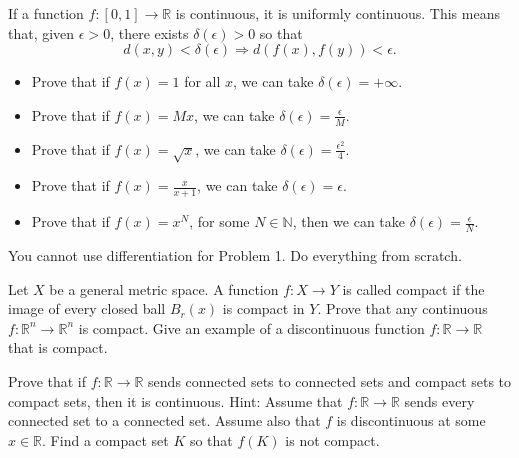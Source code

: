   \begin{exercise}
    If a function $f : [0, 1] \to \mathbb{R}$ is continuous, it is uniformly continuous. This means that, given $\epsilon > 0$, there exists $\delta(\epsilon) > 0$ so that
    \begin{equation}
      d(x, y) < \delta(\epsilon) \Rightarrow d(f(x), f(y)) < \epsilon.
    \end{equation}
    \begin{itemize}
      \item Prove that if $f(x) = 1$ for all $x$, we can take $\delta(\epsilon) = +\infty$.
      \item Prove that if $f(x) = Mx$, we can take $\delta(\epsilon) = \frac{\epsilon}{M}$.
      \item Prove that if $f(x) = \sqrt{x}$, we can take $\delta(\epsilon) = \frac{\epsilon^2}{4}$.
      \item Prove that if $f(x) = \frac{x}{x+1}$, we can take $\delta(\epsilon) = \epsilon$.
      \item Prove that if $f(x) = x^N$, for some $N \in \mathbb{N}$, then we can take $\delta(\epsilon) = \frac{\epsilon}{N}$.
    \end{itemize}
    You cannot use differentiation for Problem 1. Do everything from scratch.
  \end{exercise}
  \begin{solution}

  \end{solution}

  \begin{exercise}
    Let $X$ be a general metric space. A function $f : X \to Y$ is called compact if the image of every closed ball $B_r(x)$ is compact in $Y$. Prove that any continuous $f : \mathbb{R}^n \to \mathbb{R}^n$ is compact. Give an example of a discontinuous function $f : \mathbb{R} \to \mathbb{R}$ that is compact.
  \end{exercise}
  \begin{solution}

  \end{solution}

  \begin{exercise}
    Prove that if $f : \mathbb{R} \to \mathbb{R}$ sends connected sets to connected sets and compact sets to compact sets, then it is continuous. Hint: Assume that $f : \mathbb{R} \to \mathbb{R}$ sends every connected set to a connected set. Assume also that $f$ is discontinuous at some $x \in \mathbb{R}$. Find a compact set $K$ so that $f(K)$ is not compact.
  \end{exercise}
  \begin{solution}

  \end{solution}

